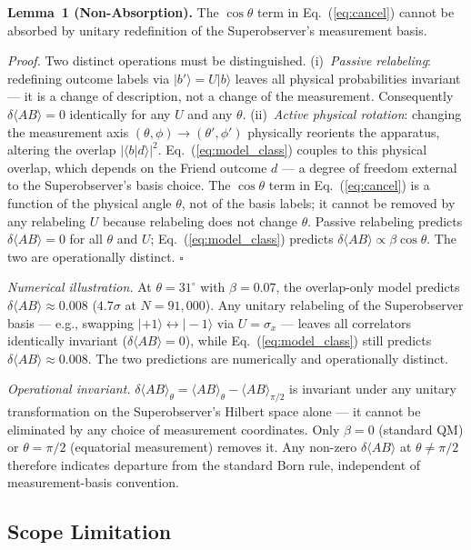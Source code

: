 \documentclass[twocolumn,aps,pra,superscriptaddress,floatfix,10pt]{revtex4-2}
\begin{document}
\textbf{Lemma~1 (Non-Absorption).} The $\cos\theta$ term in Eq.~(\ref{eq:cancel}) cannot be absorbed
by unitary redefinition of the Superobserver's measurement basis.

\emph{Proof.} Two distinct operations must be distinguished. (i)~\emph{Passive
relabeling}: redefining outcome labels via $|b'\rangle = U|b\rangle$ leaves all
physical probabilities invariant --- it is a change of description, not a
change of the measurement. Consequently $\delta\langle AB\rangle = 0$ identically for any
$U$ and any $\theta$. (ii)~\emph{Active physical rotation}: changing the measurement
axis $(\theta, \phi) \to (\theta', \phi')$ physically reorients the apparatus, altering the
overlap $|\langle b|d\rangle|^2$. Eq.~(\ref{eq:model_class}) couples to this physical overlap, which
depends on the Friend outcome $d$ --- a degree of freedom external to the
Superobserver's basis choice. The $\cos\theta$ term in Eq.~(\ref{eq:cancel}) is a function of
the physical angle $\theta$, not of the basis labels; it cannot be removed by
any relabeling $U$ because relabeling does not change $\theta$. Passive
relabeling predicts $\delta\langle AB\rangle = 0$ for all $\theta$ and $U$; Eq.~(\ref{eq:model_class}) predicts
$\delta\langle AB\rangle \propto \beta \cos\theta$. The two are operationally distinct. $\square$

\emph{Numerical illustration.} At $\theta = 31^\circ$ with $\beta = 0.07$, the overlap-only
model predicts $\delta\langle AB\rangle \approx 0.008$ ($4.7\sigma$ at $N = 91{,}000$). Any unitary
relabeling of the Superobserver basis --- e.g., swapping $|+1\rangle \leftrightarrow |-1\rangle$
via $U = \sigma_x$ --- leaves all correlators identically invariant
($\delta\langle AB\rangle = 0$), while Eq.~(\ref{eq:model_class}) still predicts $\delta\langle AB\rangle \approx 0.008$. The two
predictions are numerically and operationally distinct.

\emph{Operational invariant.} $\delta\langle AB\rangle_\theta = \langle AB\rangle_\theta - \langle AB\rangle_{\pi/2}$ is invariant
under any unitary transformation on the Superobserver's Hilbert space
alone --- it cannot be eliminated by any choice of measurement coordinates.
Only $\beta = 0$ (standard QM) or $\theta = \pi/2$ (equatorial measurement) removes it.
Any non-zero $\delta\langle AB\rangle$ at $\theta \neq \pi/2$ therefore indicates departure from the
standard Born rule, independent of measurement-basis convention.

\subsection{Scope Limitation}
\label{sec:scope}
\end{document}
